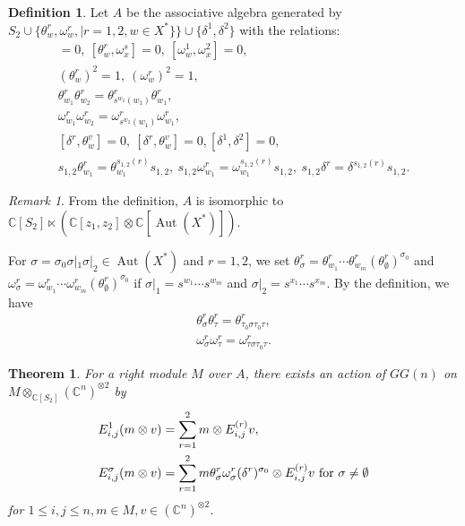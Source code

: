 \documentclass{article}
\newtheorem{Theorem}[equation]{Theorem}
\theoremstyle{definition}
\newtheorem{Definition}[equation]{Definition}
\theoremstyle{remark}
\newtheorem{Remark}[equation]{Remark}
\numberwithin{equation}{section}
\DeclareMathOperator{\Aut}{Aut}
\numberwithin{equation}{section}
\begin{document}
\begin{Definition}
Let $A$ be the associative algebra generated by $S_2\cup\{\theta^r_w,\omega^r_w,\mid r=1,2,w\in X^*\}\}\cup\{\delta^1,\delta^2\}$ with the relations:
\begin{gather}
 [\theta^1_w,\theta^2_x]=0,\ [\theta^r_w,\omega^s_x]=0,\ [\omega^1_w,\omega^2_x]=0,\label{A1}\\
 (\theta^r_w)^2=1,\ (\omega^r_w)^2=1,\label{A2}\\
 \theta^r_{w_1}\theta^r_{w_2}=\theta^r_{s^{w_2}(w_1)}\theta^r_{w_1},\label{A3}\\
 \omega^r_{w_1}\omega^r_{w_2}=\omega^r_{s^{w_2}(w_1)}\omega^r_{w_1},\label{A3-1}\\
 [\delta^r,\theta^v_w]=0,\ [\delta^r,\theta^v_w]=0,[\delta^1,\delta^2]=0,\label{A4}\\
 s_{1,2}\theta^r_{w_1}=\theta^{s_{1,2}(r)}_{w_1}s_{1,2},\  s_{1,2}\omega^r_{w_1}=\omega^{s_{1,2}(r)}_{w_1}s_{1,2},\  s_{1,2}\delta^r=\delta^{s_{1,2}(r)}s_{1,2}.\label{A5}
\end{gather}
\end{Definition}
\begin{Remark}
From the definition, $A$ is isomorphic to $\mathbb{C}[S_2]\ltimes(\mathbb{C}[z_1,z_2]\otimes\mathbb{C}[\Aut(X^*)])$.
\end{Remark}
For $\sigma=\sigma_0\sigma|_1\sigma|_2\in\Aut(X^*)$ and $r=1,2$, we set $\theta^r_{\sigma}=\theta^r_{w_1}\cdots\theta^r_{w_m}(\theta^r_\emptyset)^{\sigma_0}$ and $\omega^r_{\sigma}=\omega^r_{w_1}\cdots\omega^r_{w_m}(\theta^r_\emptyset)^{\sigma_0}$ if $\sigma|_1=s^{w_1}\cdots s^{w_m}$ and $\sigma|_2=s^{x_1}\cdots s^{x_m}$. By the definition, we have
\begin{gather}
\theta^r_\sigma\theta^r_\tau=\theta^r_{\tau_0\sigma\tau_0\tau},\label{grorious1}\\
\omega^r_\sigma\omega^r_\tau=\omega^r_{\tau\sigma\tau_0\tau}.\label{grorious2}
\end{gather}
\begin{Theorem}\label{SW-2-2}
For a right module $M$ over $A$, there exists an action of $GG(n)$ on $M\otimes_{\mathbb{C}[S_2]}(\mathbb{C}^n)^{\otimes 2}$ by
\begin{align*}
E^1_{i,j}(m\otimes v)&=\sum_{r=1}^2\limits m\otimes E^{(r)}_{i,j}v,\\
E^\sigma_{i,j}(m\otimes v)&=\sum_{r=1}^2\limits m\theta^r_{\sigma}\omega^r_{\sigma}(\delta^r)^{\sigma_0}\otimes E^{(r)}_{i,j}v\text{ for }\sigma\neq\emptyset
\end{align*}
for $1\leq i,j\leq n,m\in M,v\in(\mathbb{C}^n)^{\otimes2}$.
\end{Theorem}
\end{document}
